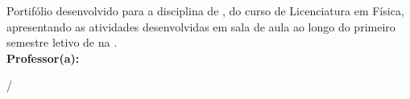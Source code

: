 \begin{center}	
	\textsc{\titulo}
\end{center}

\vspace{2cm}	

\begin{center}
	\autor
\end{center}

\vspace{2.5cm}

\hfill \parbox{8.5cm}{\noindent
Portifólio desenvolvido para a disciplina de \disciplina , do curso de Licenciatura em Física, apresentando as atividades desenvolvidas em sala de aula ao longo do primeiro semestre letivo de \ano na \instituicao.\vspace{.5cm}\\
\textbf{Professor(a):} \orientador}
\vfill

\vspace{2.0cm}

\begin{center}
\cidade/\estado

\mes \ano
\end{center}

\newpage